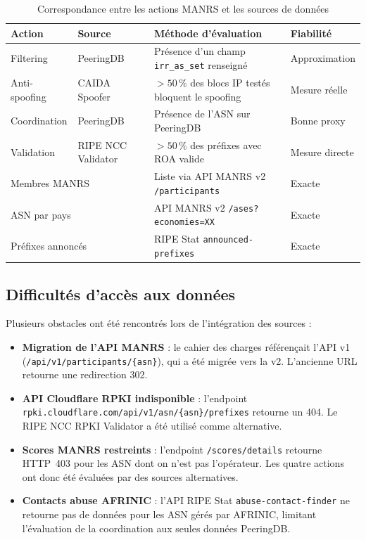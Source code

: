 \documentclass{eneam}
\begin{document}
\begin{table}[H]
\caption{Correspondance entre les actions MANRS et les sources de données}
\label{tab:sources}
\centering
\begin{tabularx}{\textwidth}{|l|l|X|l|}
\hline
\textbf{Action} & \textbf{Source} & \textbf{Méthode d'évaluation} & \textbf{Fiabilité} \\
\hline
Filtering & PeeringDB & Présence d'un champ \texttt{irr\_as\_set} renseigné & Approximation \\
\hline
Anti-spoofing & CAIDA Spoofer & $>50\,\%$ des blocs IP testés bloquent le spoofing & Mesure réelle \\
\hline
Coordination & PeeringDB & Présence de l'ASN sur PeeringDB & Bonne proxy \\
\hline
Validation & RIPE NCC Validator & $>50\,\%$ des préfixes avec ROA valide & Mesure directe \\
\hline
\multicolumn{2}{|l|}{Membres MANRS} & Liste via API MANRS v2 \texttt{/participants} & Exacte \\
\hline
\multicolumn{2}{|l|}{ASN par pays} & API MANRS v2 \texttt{/ases?economies=XX} & Exacte \\
\hline
\multicolumn{2}{|l|}{Préfixes annoncés} & RIPE Stat \texttt{announced-prefixes} & Exacte \\
\hline
\end{tabularx}
\end{table}

\subsection{Difficultés d'accès aux données}

Plusieurs obstacles ont été rencontrés lors de l'intégration des sources :

\begin{itemize}
    \item \textbf{Migration de l'API MANRS} : le cahier des charges référençait l'API v1 (\texttt{/api/v1/participants/\{asn\}}), qui a été migrée vers la v2. L'ancienne URL retourne une redirection 302.
    \item \textbf{API Cloudflare RPKI indisponible} : l'endpoint \texttt{rpki.cloudflare.com/api/v1/asn/\{asn\}/prefixes} retourne un 404. Le RIPE NCC RPKI Validator a été utilisé comme alternative.
    \item \textbf{Scores MANRS restreints} : l'endpoint \texttt{/scores/details} retourne HTTP~403 pour les ASN dont on n'est pas l'opérateur. Les quatre actions ont donc été évaluées par des sources alternatives.
    \item \textbf{Contacts abuse AFRINIC} : l'API RIPE Stat \texttt{abuse-contact-finder} ne retourne pas de données pour les ASN gérés par AFRINIC, limitant l'évaluation de la coordination aux seules données PeeringDB.
\end{itemize}
\end{document}
